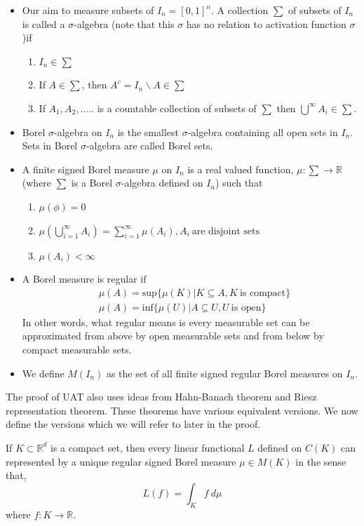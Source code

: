 \begin{itemize}
    \item Our aim to measure subsets of $I_n = [0,1]^n$. A collection $\sum$ of subsets of $I_n$ is called a 
    $\sigma$-algebra (note that this $\sigma$ has no relation to activation function $\sigma$)if 
    \begin{enumerate}
        \item $I_n \in \sum$
        \item If $A \in \sum$, then $A^c = I_n\backslash A \in \sum$
        \item If $A_1, A_2, .....$ is a countable collection of subsets of $\sum$ then $\bigcup^\infty A_i \in \sum$.
    \end{enumerate}
    \item Borel $\sigma$-algebra on $I_n$ is the smallest $\sigma$-algebra  containing all open sets in $I_n$. Sets in Borel $\sigma$-algebra 
    are called Borel sets.
    \item A finite signed Borel measure $\mu$ on $I_n$ is a real valued  function, $\mu : \sum \rightarrow \mathbb{R}$  (where
    $\sum$ is a Borel $\sigma$-algebra defined on $I_n$) such that 
    \begin{enumerate}
        \item $\mu (\phi) = 0$
        \item $\mu (\bigcup_{i=1}^{\infty} A_i) = \sum_{i=1}^{\infty} \mu(A_i), A_i \ \text{are disjoint sets}$
        \item $\mu(A_i) < \infty$
    \end{enumerate}
    \item A Borel measure is regular if 
    \begin{align*}
        &\mu(A) = \text{sup} \{\mu(K) | K \subseteq A, K \ \text{is compact}\} \\
        &\mu(A) = \text{inf} \{\mu(U) | A \subseteq U, U \ \text{is open}\}
    \end{align*}
    In other words, what regular means is every measurable set can be approximated from above by open measurable 
    sets and from below by compact measurable sets. 
    \item We define $M(I_n)$ as the set of all finite signed regular Borel measures on $I_n$.
\end{itemize}
The proof of UAT also uses ideas from Hahn-Banach theorem and Riesz representation theorem. These theorems 
have various equivalent versions. We now define the versions which we will refer to later in the proof. 
\begin{thm}
    \label{thm:RR}
    If $K \subset \mathbb{R}^d$ is a compact set, then every linear functional $L$ defined on
    $C(K)$ can represented by a unique regular signed Borel measure $\mu \in M(K)$ in the sense that,
    $$L(f) = \int_K f \ d\mu$$
    where $f: K \rightarrow \mathbb{R}$.
\end{thm}
